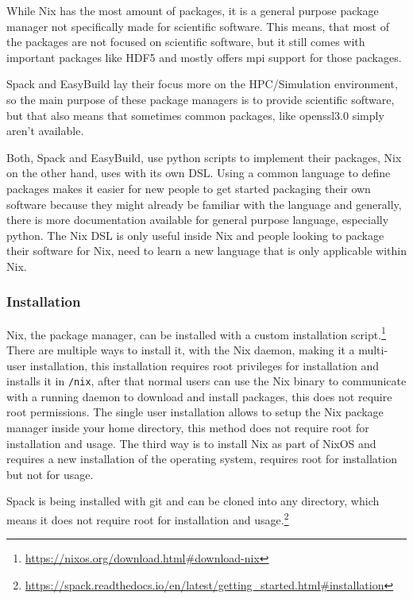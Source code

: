 \documentclass[conference,final,a4paper]{IEEEtran}
\begin{document}
While Nix has the most amount of packages, it is a general purpose package manager not specifically made for scientific software.
This means, that most of the packages are not focused on scientific software, but it still comes with important packages like HDF5 and mostly offers mpi support for those packages.

Spack and EasyBuild lay their focus more on the HPC/Simulation environment, so the main purpose of these package managers is to provide scientific software, but that also means that sometimes common packages, like openssl3.0 simply aren't available.

Both, Spack and EasyBuild, use python scripts to implement their packages, Nix on the other hand, uses with its own DSL.
Using a common language to define packages makes it easier for new people to get started packaging their own software because they might already be familiar with the language and generally, there is more documentation available for general purpose language, especially python.
The Nix DSL is only useful inside Nix and people looking to package their software for Nix, need to learn a new language that is only applicable within Nix.\\

\subsubsection{Installation}

Nix, the package manager, can be installed with a custom installation script.\footnote{\url{https://nixos.org/download.html\#download-nix}}
There are multiple ways to install it, with the Nix daemon, making it a multi-user installation, this installation requires root privileges for installation and installs it in \texttt{/nix}, after that normal users can use the Nix binary to communicate with a running daemon to download and install packages, this does not require root permissions.
The single user installation allows to setup the Nix package manager inside your home directory, this method does not require root for installation and usage.
The third way is to install Nix as part of NixOS and requires a new installation of the operating system, requires root for installation but not for usage.

Spack is being installed with git and can be cloned into any directory, which means it does not require root for installation and usage.\footnote{\url{https://spack.readthedocs.io/en/latest/getting_started.html\#installation}}
\end{document}
